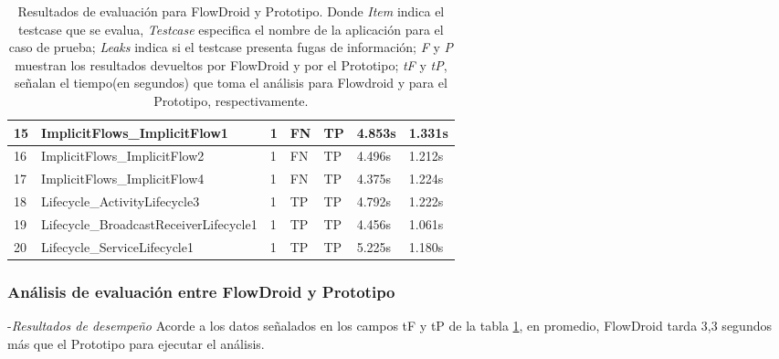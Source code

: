 \begin{table}[H]
\begin{center}
\begin{tabular}{|p{1cm}|p{6cm}|p{1cm}|p{1cm}|p{1cm}|p{1cm}|p{1cm}|}
	\hline
	15 & ImplicitFlows\_ImplicitFlow1 & 1 & FN & TP &4.853s &1.331s\\
	\hline
	16 & ImplicitFlows\_ImplicitFlow2 & 1 & FN & TP &4.496s &1.212s\\
	\hline
	17 & ImplicitFlows\_ImplicitFlow4 & 1 & FN & TP &4.375s &1.224s\\
	\hline
	18 & Lifecycle\_ActivityLifecycle3 & 1 & TP & TP &4.792s &1.222s\\
	\hline
	19 & Lifecycle\_BroadcastReceiverLifecycle1 & 1 & TP & TP &4.456s &1.061s\\
	\hline
	20 & Lifecycle\_ServiceLifecycle1 & 1 & TP & TP &5.225s &1.180s\\
	\hline
\end{tabular}
\end{center}
\caption{Resultados de evaluación para FlowDroid y Prototipo. Donde
\textit{Item} indica el testcase que se evalua, \textit{Testcase} especifica el
nombre de la aplicación para el caso de prueba; \textit{Leaks} indica si el
testcase presenta fugas de información; \textit{F} y  \textit{P} muestran los resultados devueltos por FlowDroid y por
el Prototipo; \textit{tF} y \textit{tP}, señalan el tiempo(en segundos) que toma
el análisis para Flowdroid y para el Prototipo, respectivamente.}
\label{tb:resultados}
\end{table}

\subsubsection{Análisis de evaluación entre FlowDroid y Prototipo}
-\textit{Resultados de desempeño}\newline
Acorde a los datos señalados en los campos tF y tP de la tabla
\ref{tb:resultados}, en promedio, FlowDroid tarda 3,3 segundos más que el
Prototipo para ejecutar el análisis.

